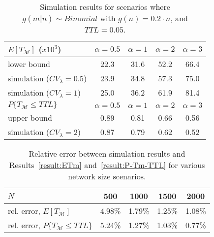 \documentclass[journal]{IEEEtran}
\begin{document}
\begin{table}[!h]
\centering
\caption{Simulation results for scenarios where $g(m|n)\sim Binomial$ with $\overline{g}(n) = 0.2\cdot n$, and $TTL=0.05$.}
\begin{footnotesize}
 \begin{tabular}{|l|cccc|}
\hline
{$E[T_{\mathcal{M}}]$ ($x 10^{3}$)}
			&   $\alpha = 0.5$  &   $\alpha = 1$  &   $\alpha = 2$  &   $\alpha = 3$    \\
\hline
lower bound             &   22.3    	    &	31.6	      &		52.2  	& 	 66.4     \\
simulation ($CV_{\lambda}=0.5$) &   23.9    &	34.8          &		57.3  	&  	 75.0     \\
simulation ($CV_{\lambda}=1$)   &   25.0    &	36.2          &		61.9  	&  	 81.4     \\
\hline
{$P\{T_{\mathcal{M}}\leq TTL\}$}
			&   $\alpha = 0.5$  &   $\alpha = 1$  &   $\alpha = 2$  &   $\alpha = 3$    \\
\hline
upper bound             &   0.89    	    &	0.81	      &		0.66  	& 	 0.56     \\
simulation ($CV_{\lambda}=2$)&   0.87 	    &	0.79          &		0.62  	&  	 0.52     \\
\hline
 \end{tabular}
\label{Table:synthetic-simulation-results-binomial}
\end{footnotesize}
\end{table}

\begin{table}[!h]
\centering
\caption{Relative error between simulation results and Results~\ref{result:ETm} and~\ref{result:P-Tm-TTL} for various network size scenarios.}
\begin{tabular}{|l|cccc|}
\hline
$N$		& 500 	&1000 	&1500	&2000\\
\hline
rel. error, $E[T_{\mathcal{M}}]$ &  4.98\% & 1.79\% & 1.25\% & 1.08\% \\
rel. error, $P\{T_{\mathcal{M}}\leq TTL\}$ &  5.24\% & 1.27\% & 1.03\% & 0.77\%\\
\hline
 \end{tabular}
\label{Table:relative-error-vsNetworkSize}
\end{table}
\end{document}
